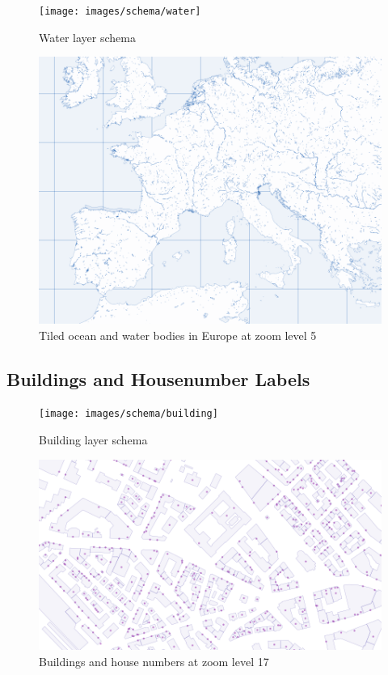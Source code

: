 \begin{figure}[H]
  \centering
  \texttt{[image: images/schema/water]}
  \caption{Water layer schema}
\end{figure}

\begin{figure}[H]
  \centering
  \includegraphics[width=1\textwidth]{images/schema/water_example}
  \caption{Tiled ocean and water bodies in Europe at zoom level 5}
\end{figure}

\subsection{Buildings and Housenumber Labels}

\begin{figure}[H]
  \centering
  \texttt{[image: images/schema/building]}
  \caption{Building layer schema}
\end{figure}

\begin{figure}[H]
  \centering
  \includegraphics[width=1\textwidth]{images/schema/building_example}
  \caption{Buildings and house numbers at zoom level 17}
\end{figure}

